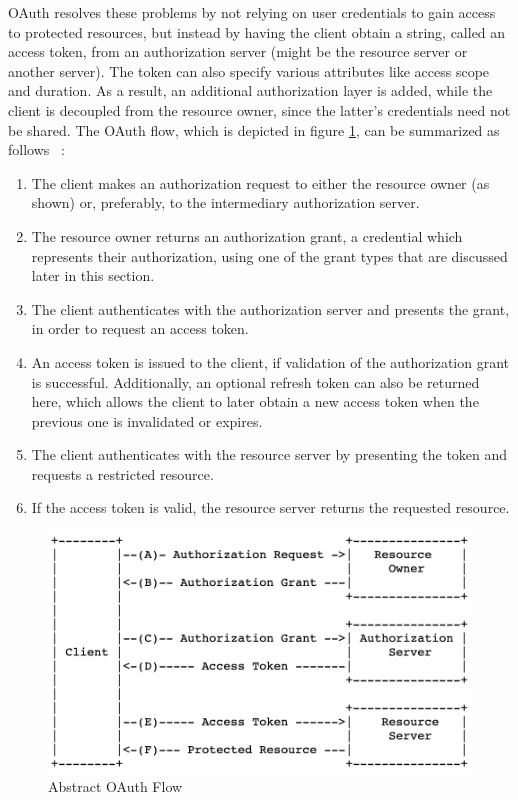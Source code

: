 OAuth resolves these problems by not relying on user credentials to gain access to protected resources, but instead by having the client obtain a string, called an access token, from an authorization server (might be the resource server or another server).  The token can also specify various attributes like access scope and duration. As a result, an additional authorization layer is added, while the client is decoupled from the resource owner, since the latter's credentials need not be shared. The OAuth flow, which is depicted in figure \ref{fig:oauth_flow}, can be summarized as follows ~\cite{oauth}:

\begin{enumerate} [(A.)]
	\item The client makes an authorization request to either the resource owner  (as shown) or, preferably, to the intermediary authorization server. 
	
	\item The resource owner returns an authorization grant, a credential which represents their authorization, using one of the grant types that are discussed later in this section. 
	
	\item The client authenticates with the authorization server and presents the grant, in order to request an access token.
	
	\item An access token is issued to the client, if validation of the authorization grant is successful. Additionally, an optional refresh token can also be returned here, which allows the client to later obtain a new access token when the previous one is invalidated or expires.
	
	\item  The client authenticates with the resource server by presenting the token and requests a restricted resource.
	
	\item If the access token is valid, the resource server returns the requested resource.
\end{enumerate}

\begin{figure} [h]
	\centering
	\includegraphics[scale=0.7]{images/oauth_flow}
	\caption{\label{fig:oauth_flow}Abstract OAuth Flow}
\end{figure}

